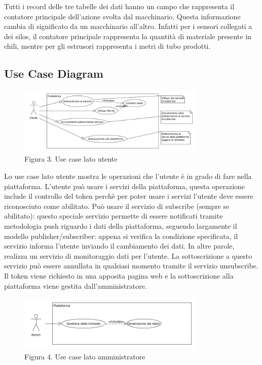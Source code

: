 Tutti i record delle tre tabelle dei dati hanno un campo che rappresenta il contatore principale dell’azione svolta dal macchinario. Questa informazione cambia di significato da un macchinario all’altro. Infatti per i sensori collegati a dei silos, il contatore principale rappresenta la quantità di materiale presente in chili, mentre per gli estrusori rappresenta i metri di tubo prodotti.
\clearpage
\subsection{Use Case Diagram}
\begin{figure}[h]
	\centering
	\includegraphics[width=0.8\textwidth]{use-case-utente.png}
	\caption*{Figura 3. Use case lato utente}
\end{figure}
Lo use case lato utente mostra le operazioni che l’utente è in grado di fare nella piattaforma. L’utente può usare i servizi della piattaforma, questa operazione include il controllo del token perchè per poter usare i servizi l’utente deve essere riconosciuto come abilitato. Può usare il servizio di subscribe (sempre se abilitato): questo speciale servizio permette di essere notificati tramite metodologia push riguardo i dati della piattaforma, seguendo largamente il modello publisher/subscriber: appena si verifica la condizione specificata, il servizio informa l’utente inviando il cambiamento dei dati. In altre parole, realizza un servizio di monitoraggio dati per l’utente. La sottoscrizione a questo servizio può essere annullata in qualsiasi momento tramite il servizio unsubscribe. Il token viene richiesto in una apposita pagina web e la sottoscrizione alla piattaforma viene gestita dall’amministratore.

\begin{figure}[h]
	\centering
	\includegraphics[width=0.8\textwidth]{use-case-admin.png}
	\caption*{Figura 4. Use case lato amministratore}
\end{figure}

